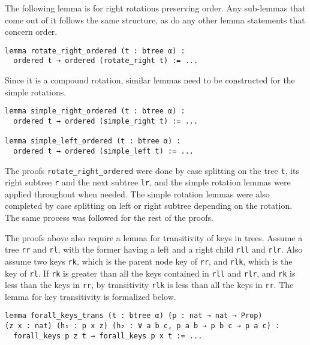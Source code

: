 The following lemma is for right rotations preserving order. Any sub-lemmas that come out of it follows the same structure, as do any other lemma statements that concern order.

\begin{lstlisting}
lemma rotate_right_ordered (t : btree α) :
  ordered t → ordered (rotate_right t) := ...
\end{lstlisting}

Since it is a compound rotation, similar lemmas need to be constructed for the simple rotations.

\begin{lstlisting}
lemma simple_right_ordered (t : btree α) :
  ordered t → ordered (simple_right t) := ...

lemma simple_left_ordered (t : btree α) :
  ordered t → ordered (simple_left t) := ...
\end{lstlisting}

The proofs \lstinline{rotate_right_ordered} were done by case splitting on the tree \lstinline{t}, its right subtree \lstinline{r} and the next subtree \lstinline{lr}, and the simple rotation lemmas were applied throughout when needed. The simple rotation lemmas were also completed by case splitting on left or right subtree depending on the rotation. The same process was followed for the rest of the proofs.

The proofs above also require a lemma for transitivity of keys in trees. Assume a tree \lstinline{rr} and \lstinline{rl}, with the former having a left and a right child \lstinline{rll} and \lstinline{rlr}. Also assume two keys \lstinline{rk}, which is the parent node key of \lstinline{rr}, and \lstinline{rlk}, which is the key of \lstinline{rl}.
If \lstinline{rk} is greater than all the keys contained in \lstinline{rll} and \lstinline{rlr}, and \lstinline{rk} is less than the keys in \lstinline{rr}, by transitivity \lstinline{rlk} is less than all the keys in \lstinline{rr}. The lemma for key transitivity is formalized below.

\begin{lstlisting}
lemma forall_keys_trans (t : btree α) (p : nat → nat → Prop) 
(z x : nat) (h₁ : p x z) (h₂ : ∀ a b c, p a b → p b c → p a c) :
  forall_keys p z t → forall_keys p x t := ...
\end{lstlisting}